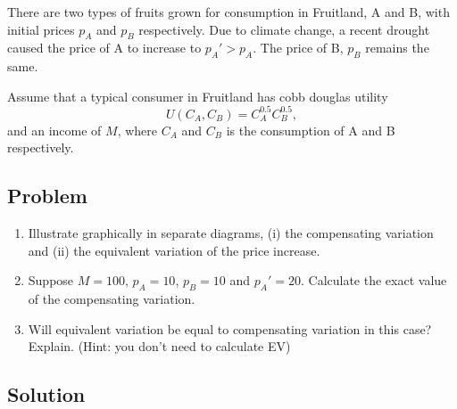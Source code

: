 \documentclass[12pt]{article}
\begin{document}
\noindent
There are two types of fruits grown for consumption in Fruitland, A and B, with initial prices \(p_A\) and \(p_B\) respectively. Due to climate change, a recent drought caused the price of A to increase to \(p_A' > p_A\). The price of B, \(p_B\) remains the same.

\medskip

\noindent
Assume that a typical consumer in Fruitland has cobb douglas utility
\[
U(C_A,C_B)=C_A^{0.5}C_B^{0.5},
\]
and an income of \(M\), where \(C_A\) and \(C_B\) is the consumption of A and B respectively.

\subsection{Problem}
\begin{enumerate}[label=(\alph*)]
    \item Illustrate graphically in separate diagrams, (i) the compensating variation and (ii) the equivalent variation of the price increase.
    \item Suppose \(M=100\), \(p_A=10\), \(p_B=10\) and \(p_A'=20\). Calculate the exact value of the compensating variation.
    \item Will equivalent variation be equal to compensating variation in this case? Explain. (Hint: you don’t need to calculate EV)
\end{enumerate}

\newpage
\subsection{Solution}
\end{document}
